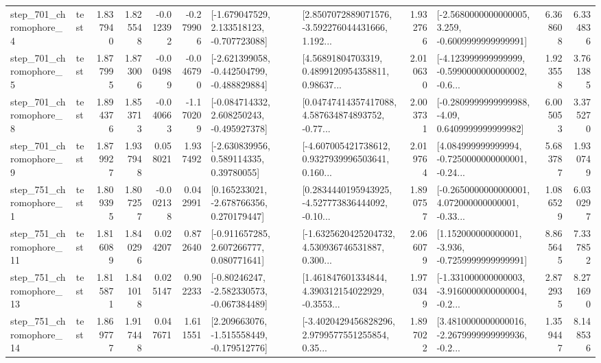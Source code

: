 \begin{tabular}{llrrrrllrlrr}
   step\_701\_chromophore\_4 &      test &      1.837940 &    1.825548 &     -0.012392 & -0.279906 &   [-1.679047529, 2.133518123, -0.707723088] &  [2.8507072889071576, -3.592276044431666, 1.192... &       1.932766 &  [-2.5680000000000005, 3.259, -0.6009999999999991] &            6.368608 &          6.334836 \\
   step\_701\_chromophore\_5 &      test &      1.877995 &    1.873006 &     -0.004989 & -0.046790 &  [-2.621399058, -0.442504799, -0.488829884] &  [4.56891804703319, 0.4899120954358811, 0.98637... &       2.010630 &  [-4.123999999999999, -0.5990000000000002, -0.6... &            1.923558 &          3.761385 \\
   step\_701\_chromophore\_8 &      test &      1.894376 &    1.853713 &     -0.040663 & -1.170209 &   [-0.084714332, 2.608250243, -0.495927378] &  [0.04747414357417088, 4.587634874893752, -0.77... &       2.003731 &   [-0.2809999999999988, -4.09, 0.6409999999999982] &            6.005053 &          3.375270 \\
   step\_701\_chromophore\_9 &      test &      1.879927 &    1.937948 &      0.058021 &  1.937492 &     [-2.630839956, 0.589114335, 0.39780055] &  [-4.607005421738612, 0.9327939996503641, 0.160... &       2.019764 &  [4.084999999999994, -0.7250000000000001, -0.24... &            5.683787 &          1.930749 \\
   step\_751\_chromophore\_1 &      test &      1.809395 &    1.807257 &     -0.002138 &  0.042991 &    [0.165233021, -2.678766356, 0.270179447] &  [0.2834440195943925, -4.527773836444092, -0.10... &       1.890757 &  [-0.2650000000000001, 4.072000000000001, -0.33... &            1.086529 &          6.030297 \\
  step\_751\_chromophore\_11 &      test &      1.816089 &    1.840296 &      0.024207 &  0.872640 &    [-0.911657285, 2.607266777, 0.080771641] &  [-1.6325620425204732, 4.530936746531887, 0.300... &       2.066079 &   [1.152000000000001, -3.936, -0.7259999999999991] &            8.865645 &          7.337852 \\
  step\_751\_chromophore\_13 &      test &      1.815871 &    1.841018 &      0.025147 &  0.902233 &   [-0.80246247, -2.582330573, -0.067384489] &  [1.461847601334844, 4.390312154022929, -0.3553... &       1.970349 &  [-1.331000000000003, -3.9160000000000004, -0.2... &            2.872935 &          8.271690 \\
  step\_751\_chromophore\_14 &      test &      1.869777 &    1.917448 &      0.047671 &  1.611551 &   [2.209663076, -1.515558449, -0.179512776] &  [-3.4020429456828296, 2.9799577551255854, 0.35... &       1.897022 &  [3.4810000000000016, -2.2679999999999936, -0.2... &            1.359447 &          8.148536 \\

\end{tabular}
